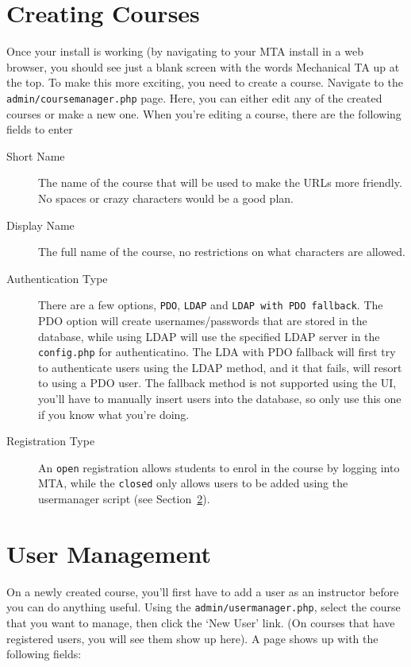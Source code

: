 \documentclass[11pt,letterpaper,oneside]{article}
\begin{document}
\section{Creating Courses}

Once your install is working (by navigating to your MTA install in a web browser, you should see just a blank screen with the words Mechanical TA up at the top. To make this more exciting, you need to create a course. Navigate to the \texttt{admin/coursemanager.php} page. Here, you can either edit any of the created courses or make a new one. When you're editing a course,  there are the following fields to enter

\begin{description}
  \item [Short Name] The name of the course that will be used to make the URLs more friendly. No spaces or crazy characters would be a good plan.
  \item [Display Name] The full name of the course, no restrictions on what characters are allowed.
  \item [Authentication Type] There are a few options,  \texttt{PDO},  \texttt{LDAP} and \texttt{LDAP with PDO fallback}. The PDO option will create usernames/passwords that are stored in the database, while using LDAP will use the specified LDAP server in the \texttt{config.php} for authenticatino. The LDA with PDO fallback will first try to authenticate users using the LDAP method, and it that fails, will resort to using a PDO user. The fallback method is not supported using the UI, you'll have to manually insert users into the database, so only use this one if you know what you're doing.
  \item [Registration Type] An \texttt{open} registration allows students to enrol in the course by logging into MTA, while the \texttt{closed} only allows users to be added using the usermanager script (see Section~\ref{users}).
\end{description}

\section{User Management}\label{users}

On a newly created course,  you'll first have to add a user as an instructor before you can do anything useful. Using the \texttt{admin/usermanager.php},  select the course that you want to manage, then click the `New User' link. (On courses that have registered users,  you will see them show up here). A page shows up with the following fields:
\end{document}
